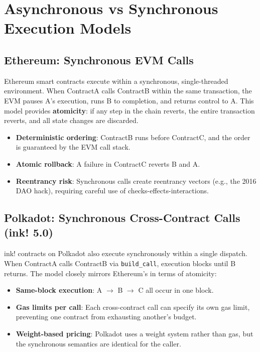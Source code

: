 \section{Asynchronous vs Synchronous Execution Models}

\subsection{Ethereum: Synchronous EVM Calls}

Ethereum smart contracts execute within a synchronous, single-threaded environment.
When ContractA calls ContractB within the same transaction, the EVM pauses A's
execution, runs B to completion, and returns control to A. This model provides
\textbf{atomicity}: if any step in the chain reverts, the entire transaction
reverts, and all state changes are discarded.

\begin{itemize}
    \item \textbf{Deterministic ordering}: ContractB runs before ContractC,
          and the order is guaranteed by the EVM call stack.
    \item \textbf{Atomic rollback}: A failure in ContractC reverts B and A.
    \item \textbf{Reentrancy risk}: Synchronous calls create reentrancy vectors
          (e.g., the 2016 DAO hack), requiring careful use of checks-effects-interactions.
\end{itemize}

\subsection{Polkadot: Synchronous Cross-Contract Calls (ink! 5.0)}

ink! contracts on Polkadot also execute synchronously within a single dispatch.
When ContractA calls ContractB via \texttt{build\_call}, execution blocks until
B returns. The model closely mirrors Ethereum's in terms of atomicity:

\begin{itemize}
    \item \textbf{Same-block execution}: A $\to$ B $\to$ C all occur in one block.
    \item \textbf{Gas limits per call}: Each cross-contract call can specify its
          own gas limit, preventing one contract from exhausting another's budget.
    \item \textbf{Weight-based pricing}: Polkadot uses a weight system rather
          than gas, but the synchronous semantics are identical for the caller.
\end{itemize}

